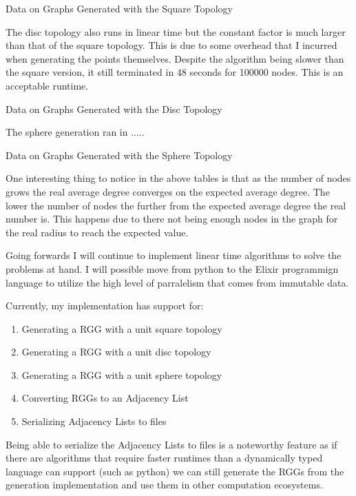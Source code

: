 \documentclass{article}
\begin{document}
	\begin{center}
	  \begin{table}[H]
			\caption{Data on Graphs Generated with the Square Topology}
		\end{table}
	\end{center}

	The disc topology also runs in linear time but the constant factor is much larger than that of the square topology.
	This is due to some overhead that I incurred when generating the points themselves.
	Despite the algorithm being slower than the square version, it still terminated in 48 seconds for 100000 nodes.
	This is an acceptable runtime.

  \begin{center}
	  \begin{table}[H]
			\caption{Data on Graphs Generated with the Disc Topology}
		\end{table}
	\end{center}

  The sphere generation ran in .....

  \begin{center}
	  \begin{table}[H]
			\caption{Data on Graphs Generated with the Sphere Topology}
		\end{table}
	\end{center}

	One interesting thing to notice in the above tables is that as the number of nodes grows the real average degree converges on the expected average degree.
	The lower the number of nodes the further from the expected average degree the real number is.
	This happens due to there not being enough nodes in the graph for the real radius to reach the expected value.

	Going forwards I will continue to implement linear time algorithms to solve the problems at hand.
	I will possible move from python to the Elixir programmign language to utilize the high level of parralelism that comes from immutable data.

  Currently, my implementation has support for:
  \begin{enumerate}
		\item Generating a RGG with a unit square topology
		\item Generating a RGG with a unit disc topology
    \item Generating a RGG with a unit sphere topology
		\item Converting RGGs to an Adjacency List
		\item Serializing Adjacency Lists to files
  \end{enumerate}
  Being able to serialize the Adjacency Lists to files is a noteworthy feature as if there are algorithms that require faster runtimes than a dynamically typed language can support (such as python) we can still generate the RGGs from the generation implementation  and use them in other computation ecosystems.
\end{document}
